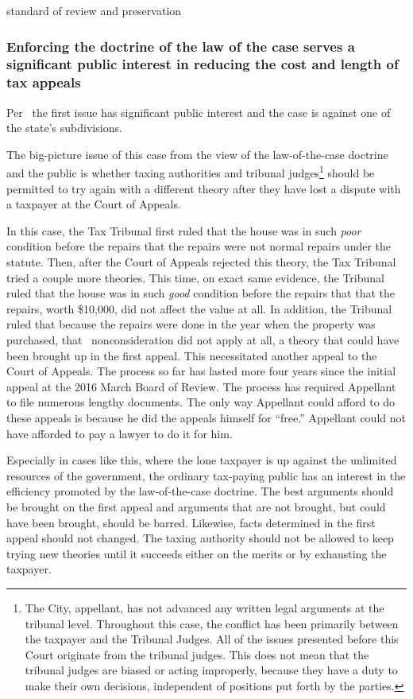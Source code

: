 \documentclass[12pt,\documentclassflag]{michiganCourtOfAppealsBrief}
\begin{document}
standard of review and preservation

\subsubsection{Enforcing the doctrine of the law of the case serves a significant public interest in reducing the cost and length of tax appeals}

Per \cite{MCR 7.305(B)(2)}\ the first issue has significant public interest and the case is against one of the state's subdivisions.

The big-picture issue of this case from the view of the law-of-the-case doctrine and the public is whether taxing authorities and tribunal judges\footnote{The City, appellant, has not advanced any written legal arguments at the tribunal level. Throughout this case, the conflict has been primarily between the taxpayer and the Tribunal Judges. All of the issues presented before this Court originate from the tribunal judges. This does not mean that the tribunal judges are biased or acting improperly, because they have a duty to make their own decisions, independent of positions put forth by the parties.} should be permitted to try again with a different theory after they have lost a dispute with a taxpayer at the Court of Appeals.

In this case, the Tax Tribunal first ruled that the house was in such \emph{poor} condition before the repairs that the repairs were not normal repairs under the statute. Then, after the Court of Appeals rejected this theory, the Tax Tribunal tried a couple more theories. This time, on exact same evidence, the Tribunal ruled that the house was in such \emph{good} condition before the repairs that that the repairs, worth \$10,000, did not affect the value at all. In addition, the Tribunal ruled that because the repairs were done in the year when the property was purchased, that \mathieuGast\ nonconsideration did not apply at all, a theory that could have been brought up in the first appeal. This necessitated another appeal to the Court of Appeals. The process so far has lasted more four years since the initial appeal at the 2016 March Board of Review. The process has required Appellant to file numerous lengthy documents. The only way Appellant could afford to do these appeals is because he did the appeals himself for ``free.'' Appellant could not have afforded to pay a lawyer to do it for him.

Especially in cases like this, where the lone taxpayer is up against the unlimited resources of the government, the ordinary tax-paying public has an interest in the efficiency promoted by the law-of-the-case doctrine. The best arguments should be brought on the first appeal and arguments that are not brought, but could have been brought, should be barred. Likewise, facts determined in the first appeal should not changed. The taxing authority should not be allowed to keep trying new theories until it succeeds either on the merits or by exhausting the taxpayer. 
\end{document}
